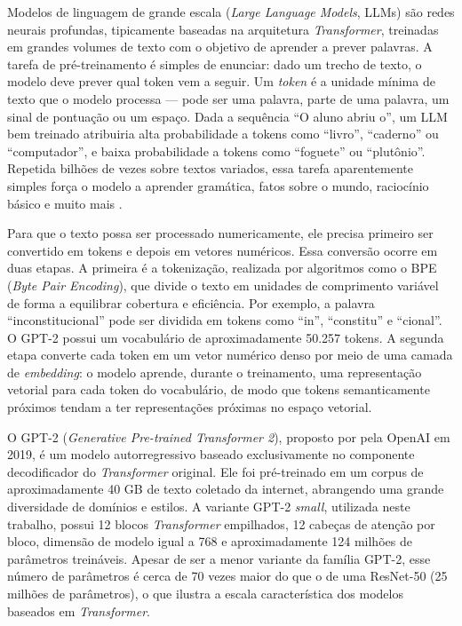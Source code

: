 Modelos de linguagem de grande escala (\textit{Large Language Models}, LLMs) são redes
neurais profundas, tipicamente baseadas na arquitetura \textit{Transformer}, treinadas em
grandes volumes de texto com o objetivo de aprender a prever palavras. A tarefa de
pré-treinamento é simples de enunciar: dado um trecho de texto, o modelo deve prever
qual token vem a seguir. Um \textit{token} é a unidade mínima de texto que o modelo
processa --- pode ser uma palavra, parte de uma palavra, um sinal de pontuação ou um
espaço. Dada a sequência ``O aluno abriu o'', um LLM bem treinado atribuiria alta
probabilidade a tokens como ``livro'', ``caderno'' ou ``computador'', e baixa probabilidade
a tokens como ``foguete'' ou ``plutônio''. Repetida bilhões de vezes sobre textos variados,
essa tarefa aparentemente simples força o modelo a aprender gramática, fatos sobre o mundo,
raciocínio básico e muito mais \cite{Goodfellow2016}.

Para que o texto possa ser processado numericamente, ele precisa primeiro ser convertido
em tokens e depois em vetores numéricos. Essa conversão ocorre em duas etapas. A primeira
é a tokenização, realizada por algoritmos como o BPE (\textit{Byte Pair Encoding}), que
divide o texto em unidades de comprimento variável de forma a equilibrar cobertura e
eficiência. Por exemplo, a palavra ``inconstitucional'' pode ser dividida em tokens como
``in'', ``constitu'' e ``cional''. O GPT-2 possui um vocabulário de aproximadamente
50.257 tokens. A segunda etapa converte cada token em um vetor numérico denso por meio
de uma camada de \textit{embedding}: o modelo aprende, durante o treinamento, uma
representação vetorial para cada token do vocabulário, de modo que tokens semanticamente
próximos tendam a ter representações próximas no espaço vetorial.

O GPT-2 (\textit{Generative Pre-trained Transformer 2}), proposto por
 pela OpenAI em 2019, é um modelo autorregressivo baseado
exclusivamente no componente decodificador do \textit{Transformer} original. Ele foi
pré-treinado em um corpus de aproximadamente 40 GB de texto coletado da internet,
abrangendo uma grande diversidade de domínios e estilos. A variante GPT-2 \textit{small},
utilizada neste trabalho, possui 12 blocos \textit{Transformer} empilhados, 12 cabeças de
atenção por bloco, dimensão de modelo igual a 768 e aproximadamente 124 milhões de
parâmetros treináveis. Apesar de ser a menor variante da família GPT-2, esse número de
parâmetros é cerca de 70 vezes maior do que o de uma ResNet-50 (25 milhões de
parâmetros), o que ilustra a escala característica dos modelos baseados em \textit{Transformer}.

